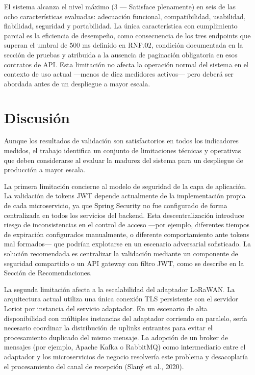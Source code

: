 \documentclass[12pt,a4paper,oneside]{report}
\begin{document}
El sistema alcanza el nivel máximo (3 --- Satisface plenamente) en seis de las ocho características evaluadas: adecuación funcional, compatibilidad, usabilidad, fiabilidad, seguridad y portabilidad. La única característica con cumplimiento parcial es la eficiencia de desempeño, como consecuencia de los tres endpoints que superan el umbral de 500 ms definido en RNF.02, condición documentada en la sección de pruebas y atribuida a la ausencia de paginación obligatoria en esos contratos de API. Esta limitación no afecta la operación normal del sistema en el contexto de uso actual ---menos de diez medidores activos--- pero deberá ser abordada antes de un despliegue a mayor escala.

\section{Discusión}\label{sec:discusion}

Aunque los resultados de validación son satisfactorios en todos los indicadores medidos, el trabajo identifica un conjunto de limitaciones técnicas y operativas que deben considerarse al evaluar la madurez del sistema para un despliegue de producción a mayor escala.

La primera limitación concierne al modelo de seguridad de la capa de aplicación. La validación de tokens JWT depende actualmente de la implementación propia de cada microservicio, ya que Spring Security no fue configurado de forma centralizada en todos los servicios del backend. Esta descentralización introduce riesgo de inconsistencias en el control de acceso —por ejemplo, diferentes tiempos de expiración configurados manualmente, o diferente comportamiento ante tokens mal formados— que podrían explotarse en un escenario adversarial sofisticado. La solución recomendada es centralizar la validación mediante un componente de seguridad compartido o un API gateway con filtro JWT, como se describe en la Sección de Recomendaciones.

La segunda limitación afecta a la escalabilidad del adaptador LoRaWAN. La arquitectura actual utiliza una única conexión TLS persistente con el servidor Loriot por instancia del servicio adaptador. En un escenario de alta disponibilidad con múltiples instancias del adaptador corriendo en paralelo, sería necesario coordinar la distribución de uplinks entrantes para evitar el procesamiento duplicado del mismo mensaje. La adopción de un broker de mensajes (por ejemplo, Apache Kafka o RabbitMQ) como intermediario entre el adaptador y los microservicios de negocio resolvería este problema y desacoplaría el procesamiento del canal de recepción (Slaný et al., 2020).
\end{document}

